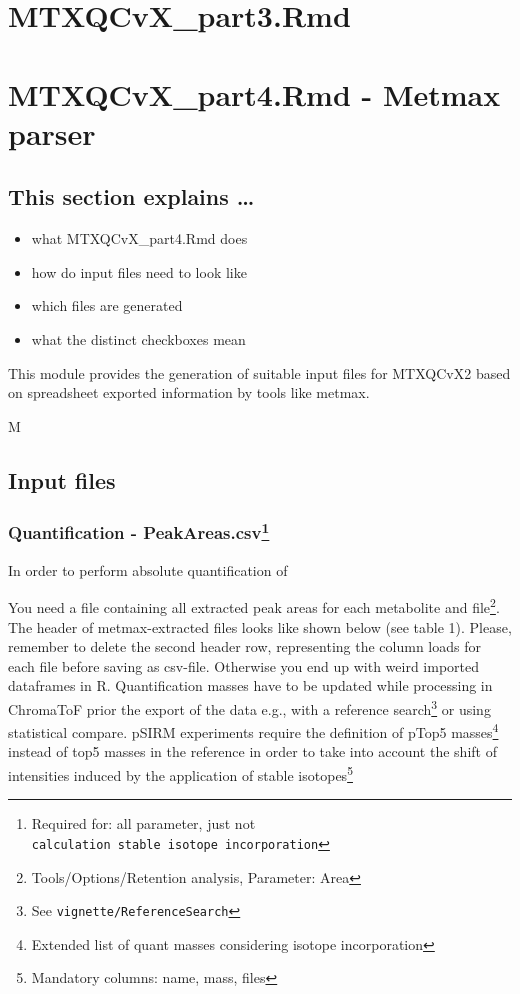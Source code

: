 \documentclass[]{book}
\providecommand{\tightlist}{%
  \setlength{\itemsep}{0pt}\setlength{\parskip}{0pt}}
\let\rmarkdownfootnote\footnote%
\def\footnote{\protect\rmarkdownfootnote}
\theoremstyle{definition}
\theoremstyle{definition}
\theoremstyle{definition}
\theoremstyle{remark}
\begin{document}
\chapter{MTXQCvX\_part3.Rmd}\label{mtxqcvx_part3.rmd}

\chapter{MTXQCvX\_part4.Rmd - Metmax
parser}\label{mtxqcvx_part4.rmd---metmax-parser}

\section{This section explains \ldots{}}\label{this-section-explains}

\begin{itemize}
\tightlist
\item
  what MTXQCvX\_part4.Rmd does
\item
  how do input files need to look like
\item
  which files are generated
\item
  what the distinct checkboxes mean
\end{itemize}

This module provides the generation of suitable input files for MTXQCvX2
based on spreadsheet exported information by tools like metmax.

M

\section{Input files}\label{input-files-1}

\subsection[Quantification -
PeakAreas.csv]{\texorpdfstring{Quantification - PeakAreas.csv\footnote{Required
  for: all parameter, just not
  \texttt{calculation\ stable\ isotope\ incorporation}}}{Quantification - PeakAreas.csv}}\label{quantification---peakareas.csv}

In order to perform absolute quantification of

You need a file containing all extracted peak areas for each metabolite
and file\footnote{Tools/Options/Retention analysis, Parameter: Area}.
The header of metmax-extracted files looks like shown below (see table
1). Please, remember to delete the second header row, representing the
column loads for each file before saving as csv-file. Otherwise you end
up with weird imported dataframes in R. Quantification masses have to be
updated while processing in ChromaToF prior the export of the data e.g.,
with a reference search\footnote{See \texttt{vignette/ReferenceSearch}}
or using statistical compare. pSIRM experiments require the definition
of pTop5 masses\footnote{Extended list of quant masses considering
  isotope incorporation} instead of top5 masses in the reference in
order to take into account the shift of intensities induced by the
application of stable isotopes\footnote{Mandatory columns: name, mass,
  files}
\end{document}
